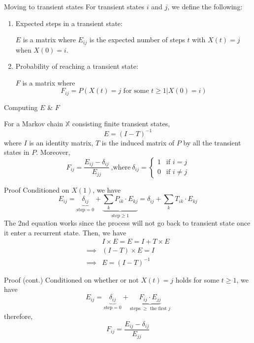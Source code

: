 \documentclass[mathserif]{beamer}
\begin{document}
\begin{frame}{Moving to transient states}
For transient states $i$ and $j$, we define the following:
\begin{enumerate}
\item Expected steps in a transient state:
	\begin{definition}
	$E$ is a matrix where $E_{ij}$ is the expected number of steps $t$ with $X(t) = j$ when $X(0)=i$.
	\end{definition}
\item Probability of reaching a transient state:
	\begin{definition}
	$F$ is a matrix where
	\[
	F_{ij} = P(X(t)=j \text{ for some } t \geq 1 | X(0)=i)
	\]
	\end{definition}
\end{enumerate}
\end{frame}

\begin{frame}{Computing $E$ \& $F$}
\begin{theorem}
For a Markov chain $\mathbb{X}$ consisting finite transient states,
\[
E = (I - T)^{-1}
\]
where $I$ is an identity matrix, $T$ is the induced matrix of $P$ by all the transient states in $P$.
Moreover,
\[
F_{ij} = \frac{E_{ij} - \delta_{ij}}{E_{jj}} ~\text{,where}~ \delta_{ij}=
\begin{cases}
1 & \text{if } i=j \\
0 & \text{if } i \neq j
\end{cases}
\]
\end{theorem}
\end{frame}

\begin{frame}{Proof}
Conditioned on $X(1)$, we have
\[
E_{ij} = \underbrace{\delta_{ij}}_{\text{step} = 0} + 
	\underbrace{\sum_k P_{ik} \cdot E_{kj}}_{\text{step} \geq 1}
	= \delta_{ij} + \sum_k T_{ik} \cdot E_{kj}
\]
The 2nd equation works since the process will not go back to transient state once it enter a recurrent state.
Then, we have
\begin{align*}
& I \times E = E = I + T \times E \\
\implies & (I - T) \times E = I \\
\implies & E = (I - T)^{-1}
\end{align*}
\end{frame}

\begin{frame}{Proof (cont.)}
Conditioned on whether or not $X(t) = j$ holds for some $t \geq 1$, we have
\[
E_{ij} = \underbrace{\delta_{ij}}_{\text{step} = 0} + 
	\underbrace{F_{ij} \cdot E_{jj}}_{\text{steps $\geq$ the first $j$}}
\]
therefore,
\[
F_{ij} = \frac{E_{ij} - \delta_{ij}}{E_{jj}}
\]
\end{frame}
\end{document}
